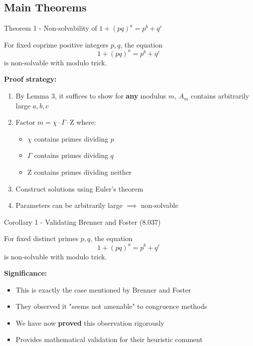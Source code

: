 \subsection{Main Theorems}

\begin{frame}{Theorem 1 - Non-solvability of $1+(pq)^a = p^b + q^c$}
    \begin{theorems}
        For fixed coprime positive integers $p,q$, the equation
        \[1+(pq)^a = p^b + q^c\]
        is non-solvable with modulo trick.
    \end{theorems}

    \textbf{Proof strategy:}
    \begin{enumerate}
        \item By Lemma 3, it suffices to show for \textbf{any} modulus $m$, $A_m$ contains arbitrarily large $a,b,c$
        \item Factor $m = \chi \cdot \Gamma \cdot \mathrm{Z}$ where:
            \begin{itemize}
                \item $\chi$ contains primes dividing $p$
                \item $\Gamma$ contains primes dividing $q$
                \item $\mathrm{Z}$ contains primes dividing neither
            \end{itemize}
        \item Construct solutions using Euler's theorem
        \item Parameters can be arbitrarily large $\implies$ non-solvable
    \end{enumerate}
\end{frame}

\begin{frame}{Corollary 1 - Validating Brenner and Foster (8.037)}
    \begin{corollarys}
        For fixed distinct primes $p,q$, the equation
        \[1+(pq)^a = p^b + q^c\]
        is non-solvable with modulo trick.
    \end{corollarys}

    \vspace{0.3cm}
    \textbf{Significance:}
    \begin{itemize}
        \item This is exactly the case mentioned by Brenner and Foster
        \item They observed it "seems not amenable" to congruence methods
        \item We have now \textbf{proved} this observation rigorously
        \item Provides mathematical validation for their heuristic comment
    \end{itemize}
\end{frame}

